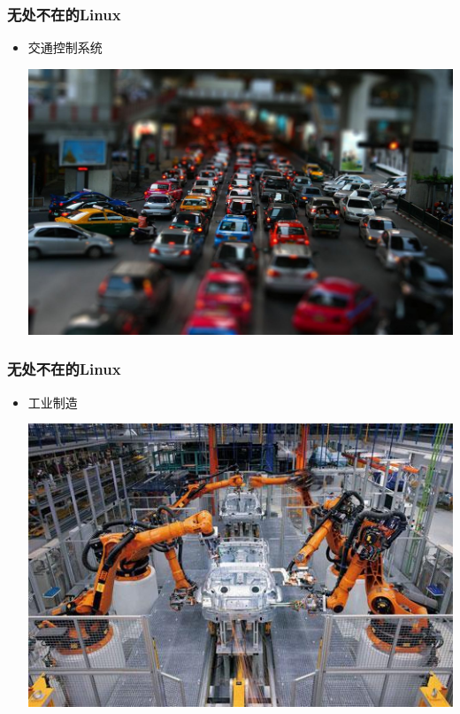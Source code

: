 \documentclass[xcolor=svgnames,bigger,presentation]{beamer}
\begin{document}
\begin{frame}
\frametitle{无处不在的Linux}
\label{sec-2-4-5}
\begin{itemize}

\item 交通控制系统
\label{sec-2-4-5-1}%
\begin{center}
\includegraphics[width=.9\linewidth]{img/traffic2.jpg}
\end{center}

\end{itemize} %
\end{frame}
\begin{frame}
\frametitle{无处不在的Linux}
\label{sec-2-4-6}
\begin{itemize}

\item 工业制造
\label{sec-2-4-6-1}%
\begin{center}
\includegraphics[width=.9\linewidth]{img/industry.jpg}
\end{center}

\end{itemize} %
\end{frame}
\end{document}
